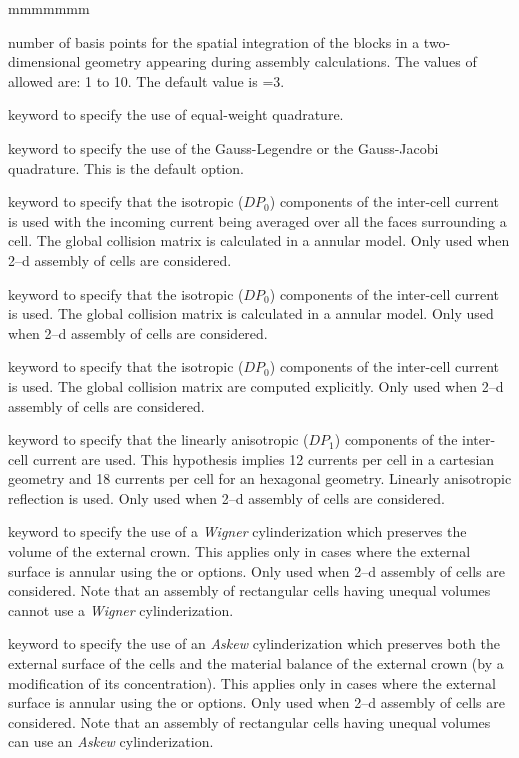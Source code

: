 \begin{ListeDeDescription}{mmmmmmm}
\item[\dusa{nsegment}] number of basis points for the spatial integration of
the blocks in a two-dimensional geometry appearing during assembly 
calculations. The values of  allowed are: 1 to 10. The default
value is =3.

\item[\moc{EQW}] keyword to specify the use of equal-weight quadrature.

\item[\moc{GAUS}] keyword to specify the use of the Gauss-Legendre or the
Gauss-Jacobi quadrature. This is the default option.

\item[\moc{ROTH}] keyword to specify that the isotropic ($DP_{0}$) components
of the inter-cell current is used with the incoming current being averaged over
all the faces surrounding a cell. The global collision matrix is calculated in a
annular model. Only used when 2--d assembly of cells are considered.

\item[\moc{ROT+}] keyword to specify that the isotropic ($DP_{0}$) components
of the inter-cell current is used. The global collision matrix is calculated in
a annular model. Only used when 2--d assembly of cells are considered.

\item[\moc{DP00}] keyword to specify that the isotropic ($DP_{0}$) components
of the inter-cell current is used. The global collision matrix are computed
explicitly. Only used when 2--d assembly of cells are considered.

\item[\moc{DP01}] keyword to specify that the linearly anisotropic ($DP_{1}$)
components of the inter-cell current are used. This hypothesis implies 12
currents per cell in a cartesian geometry and 18 currents per cell for an
hexagonal geometry. Linearly anisotropic reflection is used. Only used when 2--d
assembly of cells are considered.

\item[\moc{WIGN}] keyword to specify the use of a {\sl Wigner} cylinderization
which preserves the volume of the external crown. This applies only in cases
where the external surface is annular using the  or 
options. Only used when 2--d assembly of cells are considered. Note that an
assembly of rectangular cells having unequal volumes cannot use a {\sl Wigner}
cylinderization.  

\item[\moc{ASKE}] keyword to specify the use of an {\sl Askew} cylinderization
which preserves both the external surface of the cells and the material balance
of the external crown (by a modification of its concentration). This applies
only in cases where the external surface is annular using the  or
 options. Only used when 2--d assembly of cells are considered. Note
that an assembly of rectangular cells having unequal volumes can use an
{\sl Askew} cylinderization.  


\end{ListeDeDescription}
